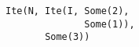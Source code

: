 \begin{lstlisting}[style=scalaioScala]
Ite(N, Ite(I, Some(2),
              Some(1)),
       Some(3))
\end{lstlisting}
